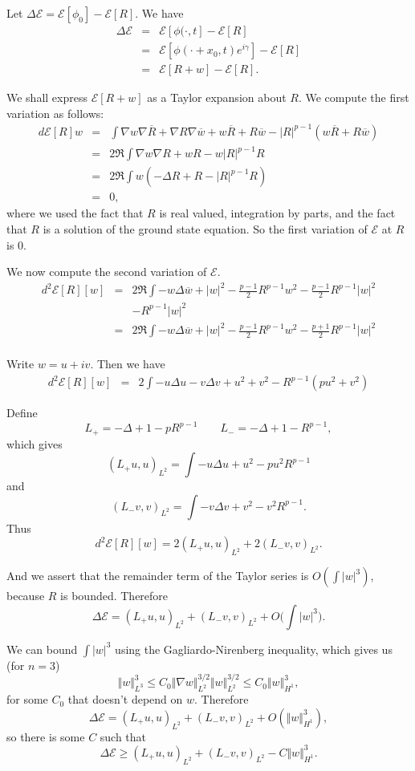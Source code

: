 \documentclass{article}
\newcommand{\norm}[1]{\Vert #1 \Vert}
\begin{document}
 Let $\Delta \mathscr{E}=\mathscr{E}[\phi_0]-\mathscr{E}[R]$. We have
 \begin{eqnarray*}
 \Delta \mathscr{E}&=&\mathscr{E}[\phi(\cdot,t]-\mathscr{E}[R]\\
 &=&\mathscr{E}[\phi(\cdot+x_0,t)e^{i\gamma}]-\mathscr{E}[R]\\
 &=&\mathscr{E}[R+w]-\mathscr{E}[R].
 \end{eqnarray*}
 
 We shall express $\mathscr{E}[R+w]$ as a Taylor expansion about $R$. We compute the first variation as follows:
\begin{eqnarray*}
d\mathscr{E}[R]w&=&\int \nabla w \nabla \overline{R}+\nabla R \nabla \overline{w}+w\overline{R}+
R\overline{w}-|R|^{p-1}(w\overline{R}+R\overline{w})\\
&=&2\Re \int \nabla w \nabla R+wR-w|R|^{p-1}R\\
&=&2\Re \int w(-\Delta R+R-|R|^{p-1}R)\\
&=&0,
\end{eqnarray*}
where we used the fact that $R$ is real valued, integration by parts, and the fact that $R$ is a solution
of the ground state equation.
So the first variation of $\mathscr{E}$ at $R$ is $0$.

We now compute the second variation of $\mathscr{E}$. 
\begin{eqnarray*}
d^2 \mathscr{E}[R][w]&=&2\Re\int -w\Delta \overline{w}+|w|^2-\frac{p-1}{2}R^{p-1}w^2
-\frac{p-1}{2}R^{p-1}|w|^2\\
&&-R^{p-1}|w|^2\\
&=&2\Re\int -w\Delta \overline{w}+|w|^2-\frac{p-1}{2}R^{p-1}w^2
-\frac{p+1}{2}R^{p-1}|w|^2\\
\end{eqnarray*}

Write $w=u+iv$. Then we have
\begin{eqnarray*}
d^2 \mathscr{E}[R][w]&=&2\int -u\Delta u -v\Delta v + u^2 +v^2 -R^{p-1}(pu^2+v^2)
\end{eqnarray*}

Define
\[
L_+=-\Delta+1-pR^{p-1} \qquad L_-=-\Delta+1-R^{p-1},
\]
which gives
\[
(L_+ u,u)_{L^2}=\int -u\Delta u + u^2 -pu^2 R^{p-1}
\]
and
\[
(L_-v,v)_{L^2}=\int -v\Delta v +v^2 - v^2 R^{p-1}.
\]
Thus
\[
d^2 \mathscr{E}[R][w]=2(L_+ u,u)_{L^2}+2(L_-v,v)_{L^2}.
\]

And we assert that the remainder term of the Taylor series is $O(\int |w|^3)$, because $R$ is bounded. Therefore
\[
\Delta \mathscr{E}=(L_+ u,u)_{L^2}+(L_-v,v)_{L^2}+O\Big(\int |w|^3\Big).
\]

We can bound $\int |w|^3$ using the Gagliardo-Nirenberg inequality, which gives us (for
$n=3$)
\[
\norm{w}_{L^3}^3 \leq C_0 \norm{\nabla w}_{L^2}^{3/2} \norm{w}_{L^2}^{3/2}
\leq C_0 \norm{w}_{H^1}^3,
\]
for some $C_0$ that doesn't depend on $w$.
Therefore
\[
\Delta \mathscr{E}=(L_+ u,u)_{L^2}+(L_-v,v)_{L^2}+O(\norm{w}_{H^1}^3),
\]
so there is some $C$ such that
\[
\Delta \mathscr{E} \geq (L_+ u,u)_{L^2}+(L_-v,v)_{L^2}-C\norm{w}_{H^1}^3.
\]
\end{document}
